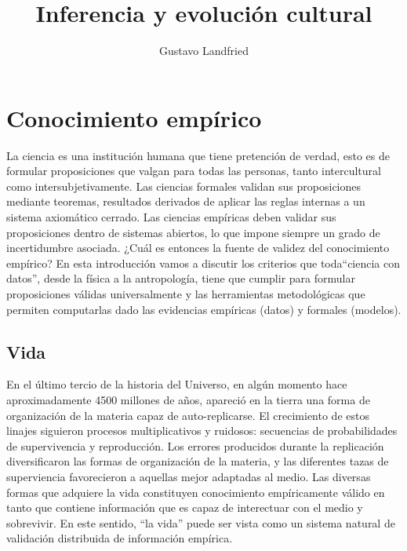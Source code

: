 \documentclass[a4paper,10pt]{book}
\title{\huge Inferencia y evolución cultural}
\author{Gustavo Landfried}
\begin{document}
\maketitle

\tableofcontents



\chapter{Conocimiento empírico}

La ciencia es una institución humana que tiene pretención de verdad, esto es de formular proposiciones que valgan para todas las personas, tanto intercultural como intersubjetivamente.
Las ciencias formales validan sus proposiciones mediante teoremas, resultados derivados de aplicar las reglas internas a un sistema axiomático cerrado.
Las ciencias empíricas deben validar sus proposiciones dentro de sistemas abiertos, lo que impone siempre un grado de incertidumbre asociada.
¿Cuál es entonces la fuente de validez del conocimiento empírico?
En esta introducción vamos a discutir los criterios que toda``ciencia con datos'', desde la física a la antropología, tiene que cumplir para formular proposiciones válidas universalmente y las herramientas metodológicas que permiten computarlas dado las evidencias empíricas (datos) y formales (modelos).





\section{Vida}\label{sec:vida}

En el último tercio de la historia del Universo, en algún momento hace aproximadamente 4500 millones de años, apareció en la tierra una forma de organización de la materia capaz de auto-replicarse.
El crecimiento de estos linajes siguieron procesos multiplicativos y ruidosos: secuencias de probabilidades de supervivencia y reproducción.
Los errores producidos durante la replicación diversificaron las formas de organización de la materia, y las diferentes tazas de superviencia favorecieron a aquellas mejor adaptadas al medio.
Las diversas formas que adquiere la vida constituyen conocimiento empíricamente válido en tanto que contiene información que es capaz de interectuar con el medio y sobrevivir.
En este sentido, ``la vida'' puede ser vista como un sistema natural de validación distribuida de información empírica.
\end{document}
